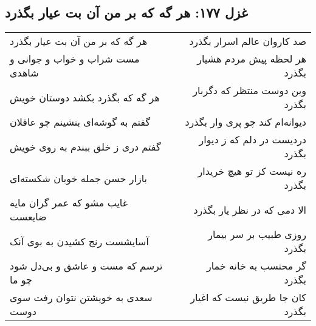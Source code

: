 \begin{center}
\section*{غزل ۱۷۷: هر گه که بر من آن بت عیار بگذرد}
\label{sec:177}
\begin{longtable}{l p{0.5cm} r}
هر گه که بر من آن بت عیار بگذرد
&&
صد کاروان عالم اسرار بگذرد
\\
مست شراب و خواب و جوانی و شاهدی
&&
هر لحظه پیش مردم هشیار بگذرد
\\
هر گه که بگذرد بکشد دوستان خویش
&&
وین دوست منتظر که دگربار بگذرد
\\
گفتم به گوشه‌ای بنشینم چو عاقلان
&&
دیوانه‌ام کند چو پری وار بگذرد
\\
گفتم دری ز خلق ببندم به روی خویش
&&
دردیست در دلم که ز دیوار بگذرد
\\
بازار حسن جمله خوبان شکسته‌ای
&&
ره نیست کز تو هیچ خریدار بگذرد
\\
غایب مشو که عمر گران مایه ضایعست
&&
الا دمی که در نظر یار بگذرد
\\
آسایشست رنج کشیدن به بوی آنک
&&
روزی طبیب بر سر بیمار بگذرد
\\
ترسم که مست و عاشق و بی‌دل شود چو ما
&&
گر محتسب به خانه خمار بگذرد
\\
سعدی به خویشتن نتوان رفت سوی دوست
&&
کان جا طریق نیست که اغیار بگذرد
\\
\end{longtable}
\end{center}
